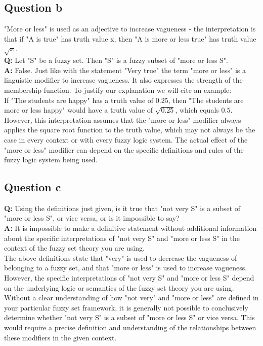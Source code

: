 \subsection{Question b}
"More or less" is used as an adjective to increase vagueness - the interpretation is that if "A is true" has truth value x, then "A is more or less true" has truth value $\sqrt{x}$.\\
\textbf{Q: }Let "S" be a fuzzy set. Then "S" is a fuzzy subset of "more or less S".\\
\textbf{A: }False. Just like with the statement "Very true" the term "more or less" is a linguistic modifier to increase vagueness. It also expresses the strength of the membership function. To justify our explanation we will cite an example:\\
If "The students are happy" has a truth value of $0.25$, then "The students are more or less happy" would have a truth value of $\sqrt{0.25}$, which equals $0.5$.\\
However, this interpretation assumes that the "more or less" modifier always applies the square root function to the truth value, which may not always be the case in every context or with every fuzzy logic system. The actual effect of the "more or less" modifier can depend on the specific definitions and rules of the fuzzy logic system being used.
\subsection{Question c}
\textbf{Q: }Using the definitions just given, is it true that "not very S" is a subset of "more or less S", or vice versa, or is it impossible to say?\\
\textbf{A: }It is impossible to make a definitive statement without additional information about the specific interpretations of "not very S" and "more or less S" in the context of the fuzzy set theory you are using.\\
The above definitions state that "very" is used to decrease the vagueness of belonging to a fuzzy set, and that "more or less" is used to increase vagueness. However, the specific interpretations of "not very S" and "more or less S" depend on the underlying logic or semantics of the fuzzy set theory you are using.\\
Without a clear understanding of how "not very" and "more or less" are defined in your particular fuzzy set framework, it is generally not possible to conclusively determine whether "not very S" is a subset of "more or less S" or vice versa. This would require a precise definition and understanding of the relationships between these modifiers in the given context.
